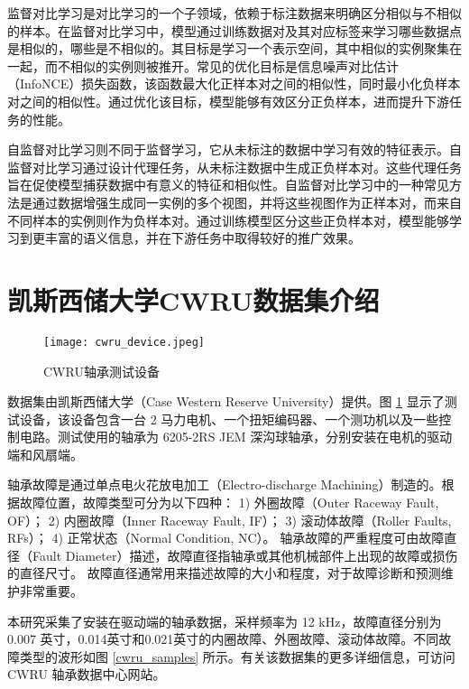 \documentclass[master]{thesis-uestc}
\begin{document}
监督对比学习是对比学习的一个子领域，依赖于标注数据来明确区分相似与不相似的样本。在监督对比学习中，模型通过训练数据对及其对应标签来学习哪些数据点是相似的，哪些是不相似的。其目标是学习一个表示空间，其中相似的实例聚集在一起，而不相似的实例则被推开。常见的优化目标是信息噪声对比估计（InfoNCE）损失函数，该函数最大化正样本对之间的相似性，同时最小化负样本对之间的相似性。通过优化该目标，模型能够有效区分正负样本，进而提升下游任务的性能。

自监督对比学习则不同于监督学习，它从未标注的数据中学习有效的特征表示。自监督对比学习通过设计代理任务，从未标注数据中生成正负样本对。这些代理任务旨在促使模型捕获数据中有意义的特征和相似性。自监督对比学习中的一种常见方法是通过数据增强生成同一实例的多个视图，并将这些视图作为正样本对，而来自不同样本的实例则作为负样本对。通过训练模型区分这些正负样本对，模型能够学习到更丰富的语义信息，并在下游任务中取得较好的推广效果。

\section{凯斯西储大学CWRU数据集介绍}
\begin{figure}
    \centering
    \texttt{[image: cwru\_device.jpeg]}
    \caption{CWRU轴承测试设备}
    \label{cwru_device}
\end{figure}
数据集由凯斯西储大学（Case Western Reserve University）提供。图 \ref{cwru_device} 显示了测试设备，该设备包含一台 2 马力电机、一个扭矩编码器、一个测功机以及一些控制电路。测试使用的轴承为 6205-2RS JEM 深沟球轴承，分别安装在电机的驱动端和风扇端。  

轴承故障是通过单点电火花放电加工（Electro-discharge Machining）制造的。根据故障位置，故障类型可分为以下四种：  
1) 外圈故障（Outer Raceway Fault, OF）；  
2) 内圈故障（Inner Raceway Fault, IF）；  
3) 滚动体故障（Roller Faults, RFs）；  
4) 正常状态（Normal Condition, NC）。  
轴承故障的严重程度可由故障直径（Fault Diameter）描述，故障直径指轴承或其他机械部件上出现的故障或损伤的直径尺寸。 故障直径通常用来描述故障的大小和程度，对于故障诊断和预测维护非常重要。

本研究采集了安装在驱动端的轴承数据，采样频率为 12 kHz，故障直径分别为 0.007 英寸，0.014英寸和0.021英寸的内圈故障、外圈故障、滚动体故障。不同故障类型的波形如图 \ref{cwru_samples} 所示。有关该数据集的更多详细信息，可访问 CWRU 轴承数据中心网站。  
\end{document}
